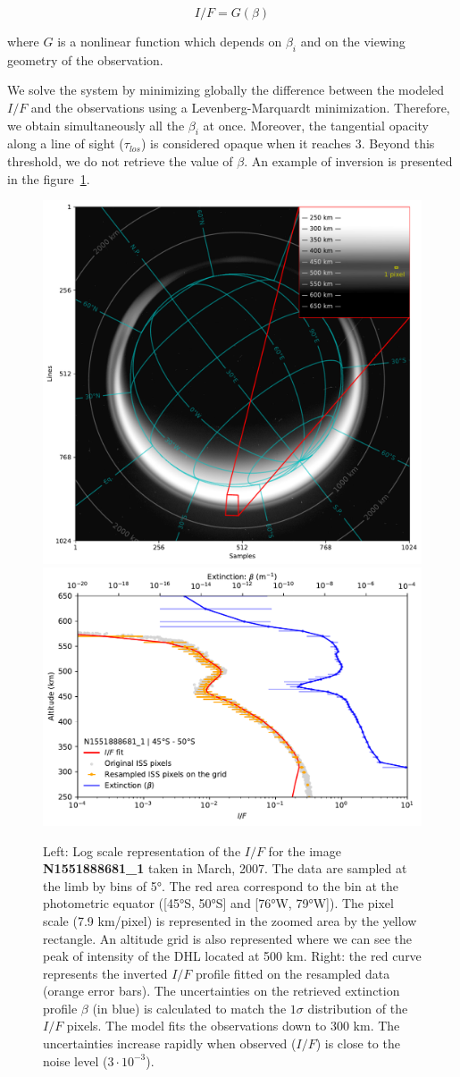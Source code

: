 \begin{equation}
    I/F = G(\beta)
\end{equation}

where ${G}$ is a nonlinear function which depends on $\beta_i$ and on the viewing geometry of the observation.

We solve the system by minimizing globally the difference between the modeled $I/F$ and the observations
using a Levenberg-Marquardt minimization. Therefore, we obtain simultaneously all the $\beta_i$ at once.
Moreover, the tangential opacity along a line of sight ($\tau_{los}$) is considered opaque when it reaches 3.
Beyond this threshold, we do not retrieve the value of $\beta$.
An example of inversion is presented in the figure~\ref{fig:model_uncertainties}.

\begin{figure}[!ht]
\includegraphics[width=.4\textwidth]{Fig/N1551888681_sampling}
\includegraphics[width=.57\textwidth]{Fig/Model_uncertainties}
\caption{Left: Log scale representation of the $I/F$  for the image
\textbf{N1551888681\_1} taken in March, 2007. The data are sampled at the limb by
bins of \ang{5}. The red area correspond to the bin at the photometric
equator ([\ang{45}S, \ang{50}S] and [\ang{76}W, \ang{79}W]). The pixel scale
(7.9 km/pixel) is represented in the zoomed area by the yellow rectangle.
An altitude grid is also represented where we can see the peak of intensity of the DHL
located at 500 km. Right: the red curve represents the inverted $I/F$ profile fitted
on the resampled data (orange error bars). The uncertainties on the retrieved
extinction profile $\beta$ (in blue) is calculated to match the $1 \sigma$ distribution
of the $I/F$ pixels. The model fits the observations down to 300 km.
The uncertainties increase rapidly when observed ($I/F$) is close
to the noise level ($3\cdot10^{-3}$).}
\label{fig:model_uncertainties}
\end{figure}

